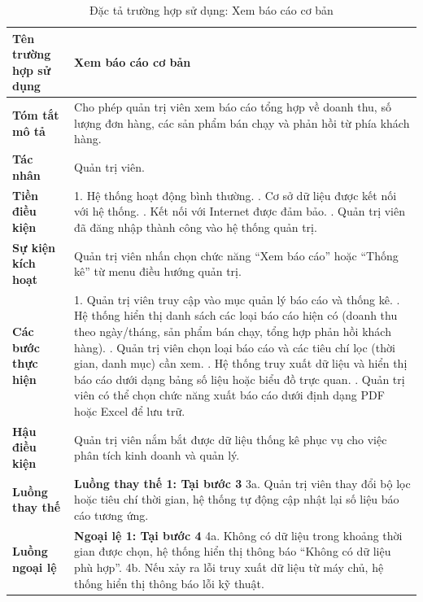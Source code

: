 {
\begin{longtable}{|>{\bfseries}p{4cm}|p{11.5cm}|}
\caption{Đặc tả trường hợp sử dụng: Xem báo cáo cơ bản}
\label{tab:uc-admin-basic-reports} \\
\hline
\textbf{Tên trường hợp sử dụng} & Xem báo cáo cơ bản \\
\hline
\textbf{Tóm tắt mô tả} & Cho phép quản trị viên xem báo cáo tổng hợp về doanh thu, số lượng đơn hàng, các sản phẩm bán chạy và phản hồi từ phía khách hàng. \\
\hline
\textbf{Tác nhân} & Quản trị viên. \\
\hline
\textbf{Tiền điều kiện} & 1. Hệ thống hoạt động bình thường. \newline
2. Cơ sở dữ liệu được kết nối với hệ thống. \newline
3. Kết nối với Internet được đảm bảo. \newline
4. Quản trị viên đã đăng nhập thành công vào hệ thống quản trị. \\
\hline
\textbf{Sự kiện kích hoạt} & Quản trị viên nhấn chọn chức năng “Xem báo cáo” hoặc “Thống kê” từ menu điều hướng quản trị. \\
\hline
\textbf{Các bước thực hiện} & 1. Quản trị viên truy cập vào mục quản lý báo cáo và thống kê. \newline
2. Hệ thống hiển thị danh sách các loại báo cáo hiện có (doanh thu theo ngày/tháng, sản phẩm bán chạy, tổng hợp phản hồi khách hàng). \newline
3. Quản trị viên chọn loại báo cáo và các tiêu chí lọc (thời gian, danh mục) cần xem. \newline
4. Hệ thống truy xuất dữ liệu và hiển thị báo cáo dưới dạng bảng số liệu hoặc biểu đồ trực quan. \newline
5. Quản trị viên có thể chọn chức năng xuất báo cáo dưới định dạng PDF hoặc Excel để lưu trữ. \\
\hline
\textbf{Hậu điều kiện} & Quản trị viên nắm bắt được dữ liệu thống kê phục vụ cho việc phân tích kinh doanh và quản lý. \\
\hline
\textbf{Luồng thay thế} & \textbf{Luồng thay thế 1: Tại bước 3} \newline
3a. Quản trị viên thay đổi bộ lọc hoặc tiêu chí thời gian, hệ thống tự động cập nhật lại số liệu báo cáo tương ứng. \\
\hline
\textbf{Luồng ngoại lệ} & \textbf{Ngoại lệ 1: Tại bước 4} \newline
4a. Không có dữ liệu trong khoảng thời gian được chọn, hệ thống hiển thị thông báo “Không có dữ liệu phù hợp”. \newline
4b. Nếu xảy ra lỗi truy xuất dữ liệu từ máy chủ, hệ thống hiển thị thông báo lỗi kỹ thuật. \\
\hline
\end{longtable}

\setlength{\extrarowheight}{0pt} 

}